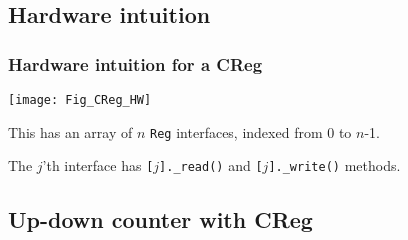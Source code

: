 
\subsection{Hardware intuition}

\begin{frame}[fragile]
\frametitle{Hardware intuition for a CReg}

\label{slide_hw_intuition}

\footnotesize

\begin{center}
 \texttt{[image: Fig\_CReg\_HW]}

 \vspace{1ex}

 This has an array of $n$ {\tt Reg} interfaces, indexed from 0 to $n$-1.

 \vspace{1ex}

 The $j$'th interface has {\tt [$j$].\_read()} and {\tt [$j$].\_write()} methods.
\end{center}

\end{frame}


\subsection{Up-down counter with CReg}

